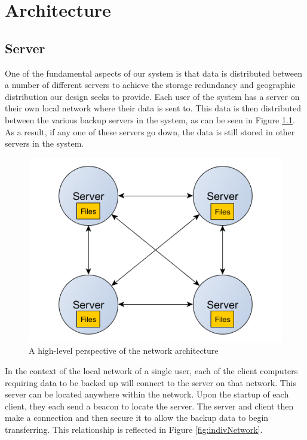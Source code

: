 \chapter{Architecture}
\section{Server}

One of the fundamental aspects of our system is that data is distributed between a number
of different servers to achieve the storage redundancy and geographic distribution our design seeks to provide.
Each user of the system has a server on their own local network where their data is sent to. This data is then
distributed between the various backup servers in the system, as can be seen in Figure \ref{fig:highLvlNetwork}.
As a result, if any one of these servers go down, the data is still stored in other servers in the system.

\begin{figure}[hb]
\centering
\includegraphics[scale=0.5]{images/architechure-diagram-server-server.png}
\caption{A high-level perspective of the network architecture}
\label{fig:highLvlNetwork}
\end{figure}

\newpage

In the context of the local network of a single user, each of the client computers requiring data to be backed up
will connect to the server on that network. This server can be located anywhere within the network.
Upon the startup of each client, they each send a beacon to locate the server. The server and client
then make a connection and then secure it to allow the backup data to begin transferring. This relationship is reflected in Figure \ref{fig:indivNetwork}.


